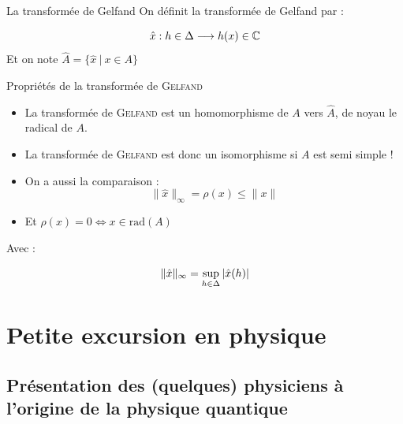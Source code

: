 \documentclass[11pt, xcolor=table]{beamer}
\begin{document}
\begin{frame}{La transformée de Gelfand}
    On définit la transformée de Gelfand par :
    \begin{mydef}
        \[
            \hat{x} : h \in \Delta \longrightarrow h(x) \in \mathbb{C} 
        \]
        Et on note $\hat{A} = \{ \hat{x} \ | \ x \in A \}$
    \end{mydef}
\end{frame}

\begin{frame}
    \begin{myth}{Propriétés de la transformée de \textsc{Gelfand}}
        \begin{itemize}
            \item La transformée de \textsc{Gelfand} est un homomorphisme de $A$ vers $\hat{A}$, de noyau le radical de $A$.
            \item La transformée de \textsc{Gelfand} est donc un isomorphisme si $A$ est semi simple !
                \item On a aussi la comparaison :
                    \[
                        \| \hat{x} \|_{\infty} = \rho(x) \leq \| x \|
                    \]
                \item Et $\rho(x) = 0 \iff x \in \mathrm{rad}(A) $
        \end{itemize}
        \end{myth}

        Avec :
        \begin{mydef}
            \[
                \| \hat{x} \|_{\infty} = \sup_{h \in \Delta } | \hat{x}(h) |
            \]
        \end{mydef}
\end{frame}


\section{Petite excursion en physique}

\subsection{Présentation des (quelques) physiciens à l'origine de la physique quantique}
\end{document}

